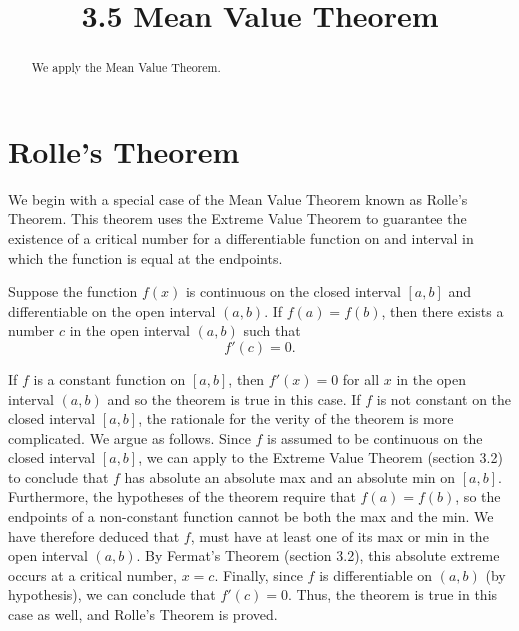 \documentclass[handout]{ximera}
\title{3.5 Mean Value Theorem}
\begin{document}
\begin{abstract}
We apply the Mean Value Theorem.
\end{abstract}

\maketitle


\section{Rolle's Theorem}

We begin with a special case of the Mean Value Theorem known as Rolle's Theorem.
This theorem uses the Extreme Value Theorem to guarantee the existence of a critical number for a differentiable 
function on and interval in which the function is equal at the endpoints.

\begin{theorem}
Suppose the function $f(x)$ is continuous on the closed interval $[a,b]$ and differentiable on the open interval $(a,b)$.
If $f(a) = f(b)$, then there exists a number $c$ in the open interval $(a,b)$ such that 
\[
f'(c) = 0.
\]
\end{theorem}

\begin{image}
\end{image}
If $f$ is a constant function on $[a,b]$, then $f'(x)= 0$ for all $x$ in the open interval $(a,b)$ and so the theorem is true in this case.
If $f$ is not constant on the closed interval $[a,b]$, the rationale for the verity of the theorem is more complicated.
We argue as follows.
Since $f$ is assumed to be continuous on the closed interval $[a,b]$, we can apply to the Extreme Value Theorem (section 3.2) to conclude
that $f$ has absolute an absolute max and an absolute min on $[a,b]$.
Furthermore, the hypotheses of the theorem require that $f(a) = f(b)$, so the endpoints of a non-constant function cannot be both the max and the min.
We have therefore deduced that 
$f$, must have at least one of its max or min in the open interval $(a,b)$.
By Fermat's Theorem (section 3.2), this absolute extreme occurs at a critical number, $x= c$. 
Finally, since $f$ is differentiable on $(a,b)$ (by hypothesis), we can conclude 
that $f'(c) = 0$. 
Thus, the theorem is true in this case as well, and Rolle's Theorem is proved.
\end{document}
